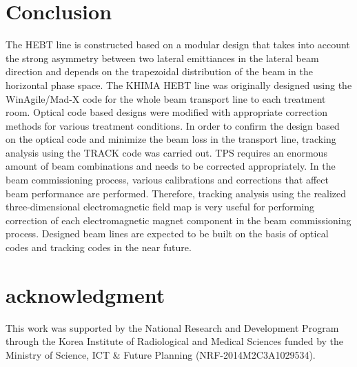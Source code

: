 \documentclass[jkps,preprint,fleqn,showpacs,showkeys]{revtex4}
\begin{document}
\section{Conclusion}
\label{sec:Con}
The HEBT line is constructed based on a modular design that takes into account the strong asymmetry
between two lateral emittiances in the lateral beam direction and depends on the trapezoidal distribution of the beam in the horizontal phase space.
The KHIMA HEBT line was originally designed using the WinAgile/Mad-X code for the whole beam transport line to each treatment room.
Optical code based designs were modified with appropriate correction methods for various treatment conditions. 
In order to confirm the design based on the optical code and minimize the beam loss in the transport line, tracking analysis using the TRACK code was carried out.
TPS requires an enormous amount of beam combinations and needs to be corrected appropriately.
In the beam commissioning process, various calibrations and corrections that affect beam performance are performed.
Therefore, tracking analysis using the realized three-dimensional electromagnetic field map is very useful
for performing correction of each electromagnetic magnet component in the beam commissioning process.
Designed beam lines are expected to be built on the basis of optical codes and tracking codes in the near future.
\section{acknowledgment}
This work was supported by the National Research and Development Program through the Korea Institute of Radiological and Medical Sciences
funded by the Ministry of Science, ICT \& Future Planning (NRF-2014M2C3A1029534).
\end{document}

